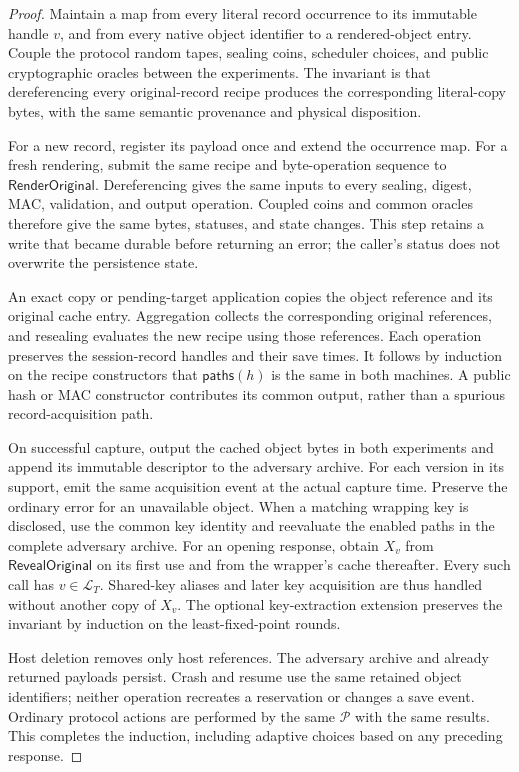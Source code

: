 \begin{proof}
Maintain a map from every literal record occurrence to its immutable handle
$v$, and from every native object identifier to a rendered-object entry.
Couple the protocol random tapes, sealing coins, scheduler choices, and public
cryptographic oracles between the experiments.  The invariant is that
dereferencing every original-record recipe produces the corresponding
literal-copy bytes, with the same semantic provenance and physical
disposition.

For a new record, register its payload once and extend the occurrence map.
For a fresh rendering, submit the same recipe and byte-operation sequence to
$\mathsf{RenderOriginal}$.  Dereferencing gives the same inputs to every
sealing, digest, MAC, validation, and output operation.  Coupled coins and
common oracles therefore give the same bytes, statuses, and state changes.
This step retains a write that became durable before returning an error;
the caller's status does not overwrite the persistence state.

An exact copy or pending-target application copies the object reference and
its original cache entry.  Aggregation collects the corresponding original
references, and resealing evaluates the new recipe using those references.
Each operation preserves the session-record handles and their save times.
It follows by induction on the recipe constructors that
$\mathsf{paths}(h)$ is the same in both machines.  A public hash or MAC
constructor contributes its common output, rather than a spurious
record-acquisition path.

On successful capture, output the cached object bytes in both experiments
and append its immutable descriptor to the adversary archive.  For each
version in its support, emit the same acquisition event at the actual
capture time.  Preserve the ordinary error for an unavailable object.
When a matching wrapping key is disclosed, use the common key identity and
reevaluate the enabled paths in the complete adversary archive.  For an
opening response, obtain $X_v$ from $\mathsf{RevealOriginal}$ on its first
use and from the wrapper's cache thereafter.  Every such call has
$v\in\mathcal L_T$.  Shared-key aliases and later key acquisition are thus
handled without another copy of $X_v$.  The optional key-extraction extension
preserves the invariant by induction on the least-fixed-point rounds.

Host deletion removes only host references.  The adversary archive and
already returned payloads persist.  Crash and resume use the same retained
object identifiers; neither operation recreates a reservation or changes a
save event.  Ordinary protocol actions are performed by the same
$\mathcal P$ with the same results.  This completes the induction, including
adaptive choices based on any preceding response.


\end{proof}
